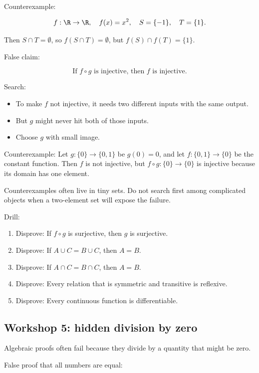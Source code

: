 Counterexample:

\[
f:\R\to\R,\quad f(x)=x^2,\quad S=\{-1\},\quad T=\{1\}.
\]

Then $S\cap T=\emptyset$, so $f(S\cap T)=\emptyset$, but $f(S)\cap f(T)=\{1\}$.

False claim:

\[
\text{If }f\circ g\text{ is injective, then }f\text{ is injective.}
\]

Search:

\begin{itemize}
\item To make $f$ not injective, it needs two different inputs with the same output.
\item But $g$ might never hit both of those inputs.
\item Choose $g$ with small image.
\end{itemize}

Counterexample: Let $g:\{0\}\to\{0,1\}$ be $g(0)=0$, and let $f:\{0,1\}\to\{0\}$ be the constant function. Then $f$ is not injective, but $f\circ g:\{0\}\to\{0\}$ is injective because its domain has one element.

\begin{trapbox}
Counterexamples often live in tiny sets. Do not search first among complicated objects when a two-element set will expose the failure.
\end{trapbox}

Drill:

\begin{enumerate}
\item Disprove: If $f\circ g$ is surjective, then $g$ is surjective.
\item Disprove: If $A\cup C=B\cup C$, then $A=B$.
\item Disprove: If $A\cap C=B\cap C$, then $A=B$.
\item Disprove: Every relation that is symmetric and transitive is reflexive.
\item Disprove: Every continuous function is differentiable.
\end{enumerate}

\subsection{Workshop 5: hidden division by zero}

Algebraic proofs often fail because they divide by a quantity that might be zero.

False proof that all numbers are equal:

